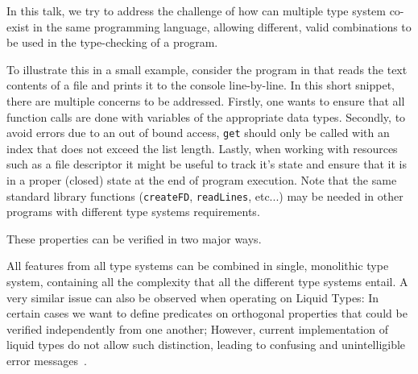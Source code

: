\documentclass{easychair}
\begin{document}
In this talk, we try to address the challenge of how can multiple type system co-exist in the same programming language, allowing different, valid combinations to be used in the type-checking of a program.
 
 
 To illustrate this in a small example, consider the program in  that reads the text contents of a file and prints it to the console line-by-line. In this short snippet, there are multiple concerns to be addressed. Firstly, one wants to ensure that all function calls are done with variables of the appropriate data types. Secondly, to avoid errors due to an out of bound access, \texttt{get} should only be called with an index that does not exceed the list length. Lastly, when working with resources such as a file descriptor it might be useful to track it's state and ensure that it is in a proper (closed) state at the end of program execution. Note that the same standard library functions (\lstinline|createFD|, \lstinline|readLines|, etc...) may be needed in other programs with different type systems requirements.
 


These properties can be verified in two major ways. 

All features from all type systems can be combined in single, monolithic type system, containing all the complexity that all the different type systems entail. A very similar issue can also be observed when operating on Liquid Types: In certain cases we want to define predicates on orthogonal properties that could be verified independently from one another; However, current implementation of liquid types do not allow such distinction, leading to confusing and unintelligible error messages~\cite{wits-error-messages}. 
\end{document}
